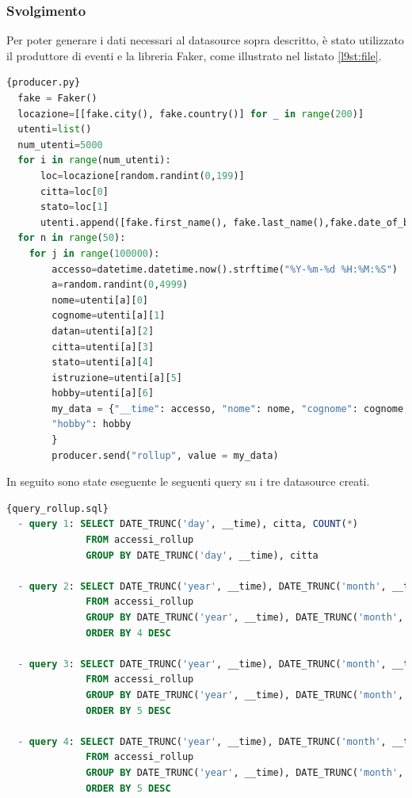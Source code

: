 \pagebreak
\subsubsection{Svolgimento}
Per poter generare i dati necessari al \gls{datasource}{} sopra descritto, 
è stato utilizzato il produttore di eventi e la libreria \gls{Faker}{}, come illustrato nel listato \ref{l9st:file}.
\begin{lstlisting}[language=Python, caption=\texttt{producer\_rollup.py}, label=l9st:file]{producer.py}
  fake = Faker()
  locazione=[[fake.city(), fake.country()] for _ in range(200)]
  utenti=list()
  num_utenti=5000
  for i in range(num_utenti):
      loc=locazione[random.randint(0,199)]
      citta=loc[0]
      stato=loc[1]
      utenti.append([fake.first_name(), fake.last_name(),fake.date_of_birth(minimum_age=18, maximum_age=89).strftime("%Y-%m-%d"), citta, stato, fake.random_element(elements=("Scuola Secondaria", "Laurea triennale", "Laurea Magistrale", "Dottorato")), fake.random_element(elements=("Leggere","Viaggiare","Giocare a calcio","Giocare ai videogiochi","Fare sport")) ] )
  for n in range(50):
    for j in range(100000):
        accesso=datetime.datetime.now().strftime("%Y-%m-%d %H:%M:%S")
        a=random.randint(0,4999)
        nome=utenti[a][0]
        cognome=utenti[a][1]
        datan=utenti[a][2]
        citta=utenti[a][3]
        stato=utenti[a][4]
        istruzione=utenti[a][5]
        hobby=utenti[a][6]
        my_data = {"__time": accesso, "nome": nome, "cognome": cognome, "datan":  datan, "citta": citta, "stato": stato, "istruzione": istruzione,
        "hobby": hobby
        }
        producer.send("rollup", value = my_data) 
    \end{lstlisting}
In seguito sono state eseguente le seguenti query su i tre \gls{datasource}{} creati.
\begin{lstlisting}[language=SQL, caption=\texttt{query\_rollup.sql}, label=lst:file]{query_rollup.sql}
  - query 1: SELECT DATE_TRUNC('day', __time), citta, COUNT(*)
              FROM accessi_rollup
              GROUP BY DATE_TRUNC('day', __time), citta
              
  - query 2: SELECT DATE_TRUNC('year', __time), DATE_TRUNC('month', __time), stato, COUNT(*)
              FROM accessi_rollup
              GROUP BY DATE_TRUNC('year', __time), DATE_TRUNC('month', __time), stato
              ORDER BY 4 DESC
  
  - query 3: SELECT DATE_TRUNC('year', __time), DATE_TRUNC('month', __time), DATE_TRUNC('day', __time), stato, citta, COUNT(*) 
              FROM accessi_rollup
              GROUP BY DATE_TRUNC('year', __time), DATE_TRUNC('month', __time), DATE_TRUNC('day', __time), stato, citta
              ORDER BY 5 DESC
  
  - query 4: SELECT DATE_TRUNC('year', __time), DATE_TRUNC('month', __time), DATE_TRUNC('day', __time), DATE_TRUNC('hour', __time), stato, citta, COUNT(*) 
              FROM accessi_rollup
              GROUP BY DATE_TRUNC('year', __time), DATE_TRUNC('month', __time), DATE_TRUNC('day', __time), DATE_TRUNC('hour', __time), stato, citta
              ORDER BY 5 DESC
  \end{lstlisting}
